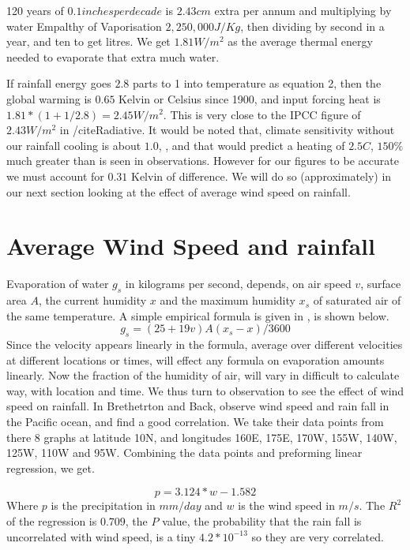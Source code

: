 \documentclass{book}
\begin{document}
   120 years of $0.1 inches per decade$ is $2.43 cm$ extra per annum and multiplying by water Empalthy of Vaporisation $2,250,000 J/Kg$, then dividing by second in a year, and ten to get litres. We get $1.81 W/m^2$ as the
   average thermal energy needed to evaporate that extra much water.
   
   If rainfall energy goes $2.8$ parts to 1 into temperature as equation 2, then the global warming is $0.65$  Kelvin or Celsius since 1900, and input forcing heat is $1.81*(1+1/2.8)= 2.45 W/m^2$. This is very close to the IPCC figure of $2.43 W/m^2$ in /cite{Radiative}. It would be noted that, climate sensitivity without our rainfall cooling is about $1.0$, \cite{wikisense}, and that would predict a heating of $2.5C$, $150\% $ much greater than is seen in observations. However for our figures to be accurate we must account for $0.31$ Kelvin  of difference. We will do so (approximately) in our next section looking at the effect of average wind speed on rainfall.
   
   \section{Average Wind Speed and rainfall}
   
   	Evaporation of water $g_s$ in kilograms per second, depends, on air speed $v$, surface area $A$, the current humidity $x$ and the maximum humidity $x_s$ of saturated air of the same temperature. A simple empirical formula is given in \cite{EngTB1}, is shown below.
   \begin{equation}
   	g_s = (25 + 19v) A (x_s - x)/3600 
   \end{equation}
   Since the velocity appears linearly in the formula, average over different velocities at different locations or times, will effect any formula on evaporation amounts linearly. Now the fraction of the humidity of air, will vary in  difficult to calculate way, with location and time. We thus turn to observation to see the effect of wind speed on rainfall. In \cite{Bretherton} Brethetrton and Back, observe wind speed and rain fall in the Pacific ocean, and find a good correlation. We take their data points from there 8 graphs at latitude 10N, and longitudes 160E, 175E, 170W, 155W, 140W, 125W, 110W and 95W. Combining the data points and preforming
   linear regression, we get.
   
   \begin{equation}
    p = 3.124 * w - 1.582 
   	\end{equation}
   Where $p$ is the precipitation in $mm/day$ and $w$ is the wind speed in $m/s$. The $R^2$ of the regression is $0.709$, the $P$ value, the probability that the rain fall is uncorrelated with wind speed, is a tiny
   $4.2*10^{-13}$ so they are very correlated.
   
\end{document}
